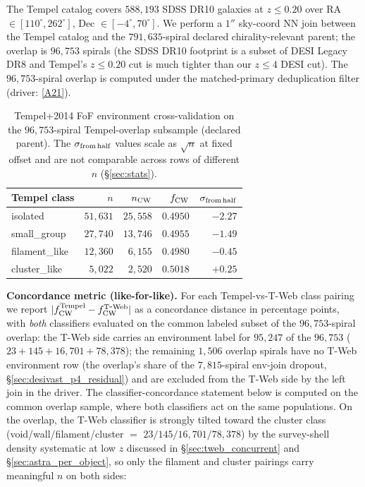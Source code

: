 \documentclass[twocolumn,linenumbers]{aastex702}
\newcommand{\repoBase}{https://github.com/Hubify-Projects/bigbounce/blob/main}
\begin{document}
The Tempel catalog covers $588{,}193$ SDSS DR10 galaxies at
$z \le 0.20$ over RA $\in [110^\circ, 262^\circ]$, Dec $\in [-4^\circ,
70^\circ]$. We perform a $1''$ sky-coord NN join between the Tempel
catalog and the $791{,}635$-spiral declared chirality-relevant parent;
the overlap is $96{,}753$ spirals (the SDSS DR10 footprint is a
subset of DESI Legacy DR8 and Tempel's $z \le 0.20$ cut is much tighter
than our $z \le 4$ DESI cut). The $96{,}753$-spiral overlap is computed
under the matched-primary deduplication filter
(driver:
\href{\repoBase/pipelines/p5\_desi\_chirality/env\_finder/03\_tempel\_cross\_validation.py}{[A21]}).

\begin{table}[t]
\caption{Tempel+2014 FoF environment cross-validation on the
$96{,}753$-spiral Tempel-overlap subsample (declared parent). The
$\sigma_{\rm from\,half}$ values scale as $\sqrt{n}$ at fixed offset
and are not comparable across rows of different $n$ (\S\ref{sec:stats}).}
\label{tab:tempel}
\begin{ruledtabular}
\begin{tabular}{lrrrr}
Tempel class & $n$ & $n_{\rm CW}$ & $f_{\rm CW}$ & $\sigma_{\rm from\,half}$ \\
\hline
isolated      & $51{,}631$ & $25{,}558$ & $0.4950$ & $-2.27$ \\
small\_group  & $27{,}740$ & $13{,}746$ & $0.4955$ & $-1.49$ \\
filament\_like & $12{,}360$ & $6{,}155$ & $0.4980$ & $-0.45$ \\
cluster\_like  & $5{,}022$  & $2{,}520$ & $0.5018$ & $+0.25$ \\
\end{tabular}
\end{ruledtabular}
\end{table}

\textbf{Concordance metric (like-for-like).} For each Tempel-vs-T-Web
class pairing we
report $|f_{\rm CW}^{\rm Tempel} - f_{\rm CW}^{\rm T\mbox{-}Web}|$ as a
concordance distance in percentage points, with \emph{both} classifiers
evaluated on the common labeled subset of the $96{,}753$-spiral
overlap: the T-Web side carries an environment label for $95{,}247$
of the $96{,}753$ ($23 + 145 + 16{,}701 + 78{,}378$); the remaining
$1{,}506$ overlap spirals have no T-Web environment row (the
overlap's share of the $7{,}815$-spiral env-join dropout,
\S\ref{sec:desivast_p4_residual}) and are excluded from the T-Web
side by the left join in the driver. The classifier-concordance
statement below is computed on the common overlap sample, where both
classifiers act on the same populations.
On the overlap, the T-Web classifier is strongly tilted toward the
cluster class (void/wall/filament/cluster $=$
$23/145/16{,}701/78{,}378$) by the survey-shell density systematic at
low $z$ discussed in \S\ref{sec:tweb_concurrent} and
\S\ref{sec:astra_per_object}, so only the filament and cluster
pairings carry meaningful $n$ on both sides:
\end{document}
